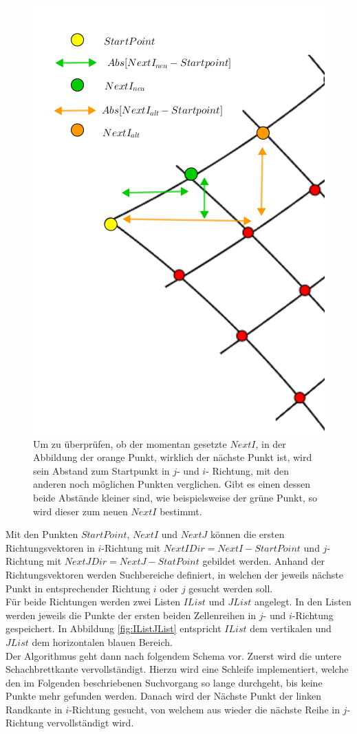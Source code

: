 \begin{figure}[!htb]
	\centering
	\includegraphics[width=0.5\linewidth]{images/SearchNextI.png}
	\caption[Überprüfung des gefundenen $NextI$]{Um zu überprüfen, ob der momentan gesetzte $NextI$, in der Abbildung der orange Punkt, wirklich der nächste Punkt ist, wird sein Abstand zum Startpunkt in $j$- und  $i$- Richtung, mit den anderen noch möglichen Punkten verglichen. Gibt es einen dessen beide Abstände kleiner sind, wie beispielsweise der grüne Punkt, so wird dieser zum neuen $NextI$ bestimmt.}
	\label{fig:FindNextIJ}
\end{figure}
\pagebreak


Mit den Punkten $StartPoint$, $NextI$ und $NextJ$ können die ersten Richtungsvektoren in $i$-Richtung mit $NextIDir= NextI - StartPoint$ und $j$- Richtung mit $NextJDir =NextJ-StatPoint$ gebildet werden. Anhand der Richtungsvektoren werden Suchbereiche definiert, in welchen der jeweils nächste Punkt in entsprechender Richtung $i$ oder $j$ gesucht werden soll.\\ 


Für beide Richtungen werden zwei Listen $IList$ und $JList$ angelegt. In den Listen werden jeweils die Punkte der ersten beiden Zellenreihen in $j$- und $i$-Richtung gespeichert. In Abbildung \ref{fig:IListJList} entspricht $IList$ dem vertikalen und $JList$ dem horizontalen blauen Bereich. \\


Der Algorithmus geht dann nach folgendem Schema vor. Zuerst wird die untere Schachbrettkante vervollständigt. Hierzu wird eine Schleife implementiert, welche den im Folgenden beschriebenen Suchvorgang so lange durchgeht, bis keine Punkte mehr gefunden werden. Danach wird der Nächste Punkt der linken Randkante in $i$-Richtung gesucht, von welchem aus wieder die nächste Reihe in $j$-Richtung vervollständigt wird.\\

